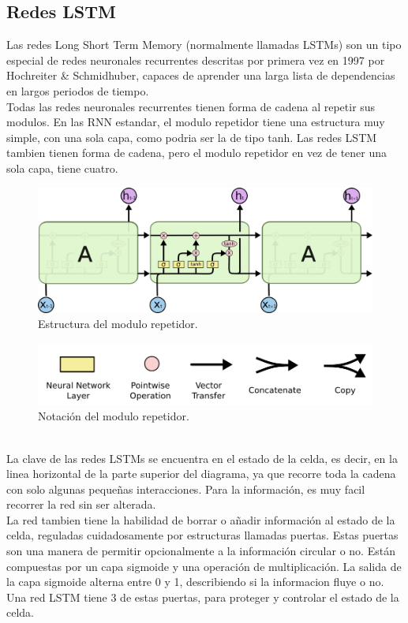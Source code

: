 \subsection{Redes LSTM}
Las redes Long Short Term Memory (normalmente llamadas LSTMs) son un tipo especial de redes neuronales recurrentes descritas por primera vez en 1997 por Hochreiter \& Schmidhuber, capaces de aprender una larga lista de dependencias en largos periodos de tiempo.\\
Todas las redes neuronales recurrentes tienen forma de cadena al repetir sus modulos. En las RNN estandar, el modulo repetidor tiene una estructura muy simple, con una sola capa, como podria ser la de tipo tanh. Las redes LSTM tambien tienen forma de cadena, pero el modulo repetidor en vez de tener una sola capa, tiene cuatro.
\begin{figure}[htp]
\centering
\includegraphics[scale=0.35]{images/LSTM3-chain.png}
\caption{Estructura del modulo repetidor.}
\end{figure}
\begin{figure}[htp]
\centering
\includegraphics[scale=0.2]{images/LSTM2-notation.png}
\caption{Notación del modulo repetidor.}
\end{figure}
\\La clave de las redes LSTMs se encuentra en el estado de la celda, es decir, en la linea horizontal de la parte superior del diagrama, ya que recorre toda la cadena con solo algunas pequeñas interacciones. Para la información, es muy facil recorrer la red sin ser alterada.\\
La red tambien tiene la habilidad de borrar o añadir información al estado de la celda, reguladas cuidadosamente por estructuras llamadas puertas. Estas puertas son una manera de permitir opcionalmente a la información circular o no. Están compuestas por un capa sigmoide y una operación de multiplicación. La salida de la capa sigmoide alterna entre 0 y 1, describiendo si la informacion fluye o no. Una red LSTM tiene 3 de estas puertas, para proteger y controlar el estado de la celda.\\\\
